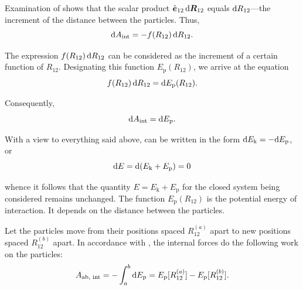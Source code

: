 \noindent
Examination of  shows that the scalar product $\hat{\boldsymbol{e}}_{12}\,\mathrm{d}\boldsymbol{R}_{12}$ equals $\mathrm{d} R_{12}$---the increment of the distance between the particles. Thus,
\begin{equation}\label{eq:3_44}
\mathrm{d} A_{\text{int}} = - f(R_{12})\,\mathrm{d} R_{12}.
\end{equation}


The expression $f(R_{12})\,\mathrm{d} R_{12}$ can be considered as the increment of a certain function of $R_{12}$. Designating this function $E_{\text{p}}(R_{12})$, we arrive at the equation
\begin{equation}\label{eq:3_45}
f(R_{12})\,\mathrm{d} R_{12} = \mathrm{d} E_{\text{p}}(R_{12}).
\end{equation}

\noindent
Consequently,
\begin{equation}\label{eq:3_46}
\mathrm{d} A_{\text{int}} = \mathrm{d} E_{\text{p}}.
\end{equation}

With a view to everything said above,  can be written in the form $\mathrm{d} E_{\text{k}}=-\mathrm{d} E_{\text{p}}$, or
\begin{equation}\label{eq:3_47}
\mathrm{d} E = \mathrm{d}(E_{\text{k}}+E_{\text{p}}) = 0
\end{equation}

\noindent
whence it follows that the quantity $E=E_{\text{k}}+E_{\text{p}}$ for the closed system being considered remains unchanged. The function $E_{\text{p}}(R_{12})$ is the potential energy of interaction. It depends on the distance between the particles.

Let the particles move from their positions spaced $R_{12}^{(a)}$ apart to new positions spaced $R_{12}^{(b)}$ apart. In accordance with , the internal forces do the following work on the particles:
\begin{equation}\label{eq:3_48}
A_{\text{ab, int}} = - \int_{a}^{b} \mathrm{d} E_{\text{p}} = E_{\text{p}}[R_{12}^{(a)}] - E_{\text{p}}[R_{12}^{(b)}].
\end{equation}

